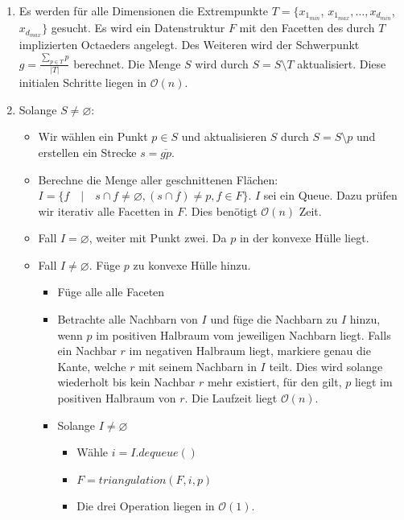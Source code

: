 \documentclass[a4paper]{article}
\begin{document}
\begin{enumerate}
	\item Es werden für alle Dimensionen die Extrempunkte $T  = \{x_{1_{min}}$, $x_{1_{max}}, \dots, x_{d_{min}}$, $x_{d_{max}}\}$ gesucht. 
	    Es wird ein Datenstruktur $F$ mit den Facetten des durch $T$ implizierten Octaeders angelegt. Des Weiteren wird der Schwerpunkt $g = \frac{\sum_{p \in T}{ p } }{|T|}$ berechnet. Die Menge $S$ wird durch $S = S \setminus T$ aktualisiert. Diese initialen Schritte liegen in $\mathcal{O}(n)$.
	\item Solange $S \neq \varnothing$:

	\begin{itemize}
		\item Wir wählen ein Punkt $p \in S$ und aktualisieren $S$ durch $S = S \setminus p$ und erstellen ein Strecke $s = \overline{gp}$.
		
		\item Berechne die Menge aller geschnittenen Flächen: $I = \{f \quad | \quad s \cap f \neq \varnothing, (s \cap f) \neq p, f \in F\}$. $I$ sei ein Queue. 
		Dazu prüfen wir iterativ alle Facetten in $F$. Dies benötigt $\mathcal{O}(n)$ Zeit.
		
		\item Fall $I = \varnothing$, weiter mit Punkt zwei. Da $p$ in der konvexe Hülle liegt.
		
		\item Fall $I \neq \varnothing$. Füge $p$ zu konvexe Hülle hinzu.
		
		\begin{itemize}
			\item Füge alle alle Faceten
			
			\item Betrachte alle Nachbarn von $I$ und füge die Nachbarn zu $I$ hinzu, wenn $p$ im positiven Halbraum vom jeweiligen Nachbarn liegt. 
			Falls ein Nachbar $r$ im negativen Halbraum liegt, markiere genau die Kante, welche $r$ mit seinem Nachbarn in $I$ teilt. 
			Dies wird solange wiederholt bis kein Nachbar $r$ mehr existiert, für den gilt, $p$ liegt im positiven Halbraum von $r$.  
			Die Laufzeit liegt $\mathcal{O}(n)$. 
			
			\item  Solange $I \neq \varnothing$
			\begin{itemize}
				\item Wähle $i = I.dequeue()$
				\item $F = triangulation(F,i,p)$ 
				\item Die drei Operation liegen in $\mathcal{O}(1)$.
			\end{itemize}
		\end{itemize}
		
	\end{itemize}		
\end{enumerate}
\end{document}
